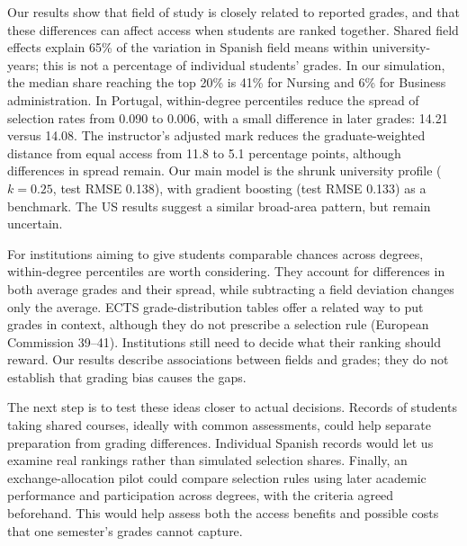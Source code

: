 Our results show that field of study is closely related to reported grades, and that these differences can affect access when students are ranked together. Shared field effects explain 65\% of the variation in Spanish field means within university-years; this is not a percentage of individual students' grades. In our simulation, the median share reaching the top 20\% is 41\% for Nursing and 6\% for Business administration. In Portugal, within-degree percentiles reduce the spread of selection rates from 0.090 to 0.006, with a small difference in later grades: 14.21 versus 14.08. The instructor's adjusted mark reduces the graduate-weighted distance from equal access from 11.8 to 5.1 percentage points, although differences in spread remain. Our main model is the shrunk university profile ($k = 0.25$, test RMSE 0.138), with gradient boosting (test RMSE 0.133) as a benchmark. The US results suggest a similar broad-area pattern, but remain uncertain.

For institutions aiming to give students comparable chances across degrees, within-degree percentiles are worth considering. They account for differences in both average grades and their spread, while subtracting a field deviation changes only the average. ECTS grade-distribution tables offer a related way to put grades in context, although they do not prescribe a selection rule (European Commission 39--41). Institutions still need to decide what their ranking should reward. Our results describe associations between fields and grades; they do not establish that grading bias causes the gaps.

The next step is to test these ideas closer to actual decisions. Records of students taking shared courses, ideally with common assessments, could help separate preparation from grading differences. Individual Spanish records would let us examine real rankings rather than simulated selection shares. Finally, an exchange-allocation pilot could compare selection rules using later academic performance and participation across degrees, with the criteria agreed beforehand. This would help assess both the access benefits and possible costs that one semester's grades cannot capture.
